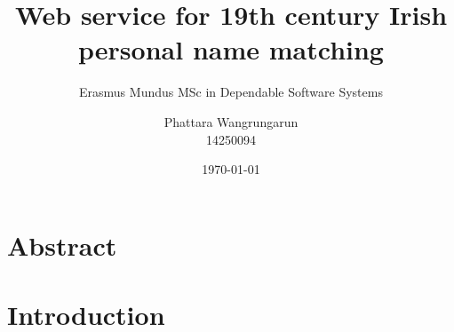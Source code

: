 \documentclass[a4paper, 11pt]{scrartcl}
\begin{document}
\title{Web service for 19th century Irish personal name matching}
\author{Phattara Wangrungarun\\14250094}
\subtitle{Erasmus Mundus MSc in Dependable Software Systems}
\date{\small\today}
\maketitle

\section*{Abstract}

\section{Introduction}
\end{document}
